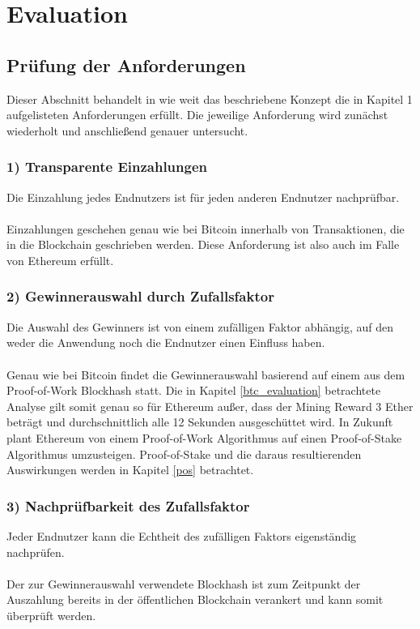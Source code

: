 \section{Evaluation}
\subsection{Prüfung der Anforderungen}

Dieser Abschnitt behandelt in wie weit das beschriebene Konzept die in Kapitel 1 aufgelisteten Anforderungen erfüllt. Die jeweilige Anforderung wird zunächst wiederholt und anschließend genauer untersucht.

\subsubsection{1) Transparente Einzahlungen}
Die Einzahlung jedes Endnutzers ist für jeden anderen Endnutzer nachprüfbar.\\\\
Einzahlungen geschehen genau wie bei Bitcoin innerhalb von Transaktionen, die in die Blockchain geschrieben werden. Diese Anforderung ist also auch im Falle von Ethereum erfüllt.
\subsubsection{2) Gewinnerauswahl durch Zufallsfaktor}
Die Auswahl des Gewinners ist von einem zufälligen Faktor abhängig, auf den weder die Anwendung noch die Endnutzer einen Einfluss haben.\\\\
Genau wie bei Bitcoin findet die Gewinnerauswahl basierend auf einem aus dem Proof-of-Work Blockhash statt. Die in Kapitel \ref{btc_evaluation} betrachtete Analyse gilt somit genau so für Ethereum außer, dass der Mining Reward 3 Ether beträgt und durchschnittlich alle 12 Sekunden ausgeschüttet wird. In Zukunft plant Ethereum von einem Proof-of-Work Algorithmus auf einen Proof-of-Stake Algorithmus umzusteigen. Proof-of-Stake und die daraus resultierenden Auswirkungen werden in Kapitel \ref{pos} betrachtet.
\subsubsection{3) Nachprüfbarkeit des Zufallsfaktor}
Jeder Endnutzer kann die Echtheit des zufälligen Faktors eigenständig nachprüfen.\\\\
Der zur Gewinnerauswahl verwendete Blockhash ist zum Zeitpunkt der Auszahlung bereits in der öffentlichen Blockchain verankert und kann somit überprüft werden.
